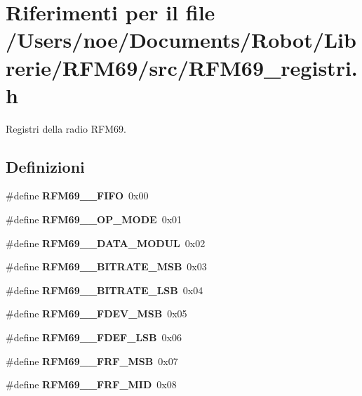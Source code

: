 \section{Riferimenti per il file /\+Users/noe/\+Documents/\+Robot/\+Librerie/\+R\+F\+M69/src/\+R\+F\+M69\+\_\+registri.h}
\label{_r_f_m69__registri_8h}


Registri della radio R\+F\+M69.  


\subsection*{Definizioni}
\begin{DoxyCompactItemize}
\item 
\mbox{\label{_r_f_m69__registri_8h_a0d65a2190c0877f705ef6b3f6bb2d181}} 
\#define {\bfseries R\+F\+M69\+\_\+\_\+\+F\+I\+FO}~0x00
\item 
\mbox{\label{_r_f_m69__registri_8h_a7026c0eeb6c9ff4a3c836b9c2510e92d}} 
\#define {\bfseries R\+F\+M69\+\_\+\_\+\+O\+P\+\_\+\+M\+O\+DE}~0x01
\item 
\mbox{\label{_r_f_m69__registri_8h_ac3e0614cefd0de36fab33cf18fd6178a}} 
\#define {\bfseries R\+F\+M69\+\_\+\_\+\+D\+A\+T\+A\+\_\+\+M\+O\+D\+UL}~0x02
\item 
\mbox{\label{_r_f_m69__registri_8h_aee33de14b2c7923a72fa3fb94675d502}} 
\#define {\bfseries R\+F\+M69\+\_\+\_\+\+B\+I\+T\+R\+A\+T\+E\+\_\+\+M\+SB}~0x03
\item 
\mbox{\label{_r_f_m69__registri_8h_a9a6fb1af1b6dbb92986013cd5fc61667}} 
\#define {\bfseries R\+F\+M69\+\_\+\_\+\+B\+I\+T\+R\+A\+T\+E\+\_\+\+L\+SB}~0x04
\item 
\mbox{\label{_r_f_m69__registri_8h_ad77df18feac22de48ea0d31db04b5f51}} 
\#define {\bfseries R\+F\+M69\+\_\+\_\+\+F\+D\+E\+V\+\_\+\+M\+SB}~0x05
\item 
\mbox{\label{_r_f_m69__registri_8h_a3fb6b789781742b9d2e2c54f52cf39a3}} 
\#define {\bfseries R\+F\+M69\+\_\+\_\+\+F\+D\+E\+F\+\_\+\+L\+SB}~0x06
\item 
\mbox{\label{_r_f_m69__registri_8h_a49246229de4a1430a500dc4acd071760}} 
\#define {\bfseries R\+F\+M69\+\_\+\_\+\+F\+R\+F\+\_\+\+M\+SB}~0x07
\item 
\mbox{\label{_r_f_m69__registri_8h_ab1ac01a794ac98b0d681bfd4162e50ee}} 
\#define {\bfseries R\+F\+M69\+\_\+\_\+\+F\+R\+F\+\_\+\+M\+ID}~0x08

\end{DoxyCompactItemize}
